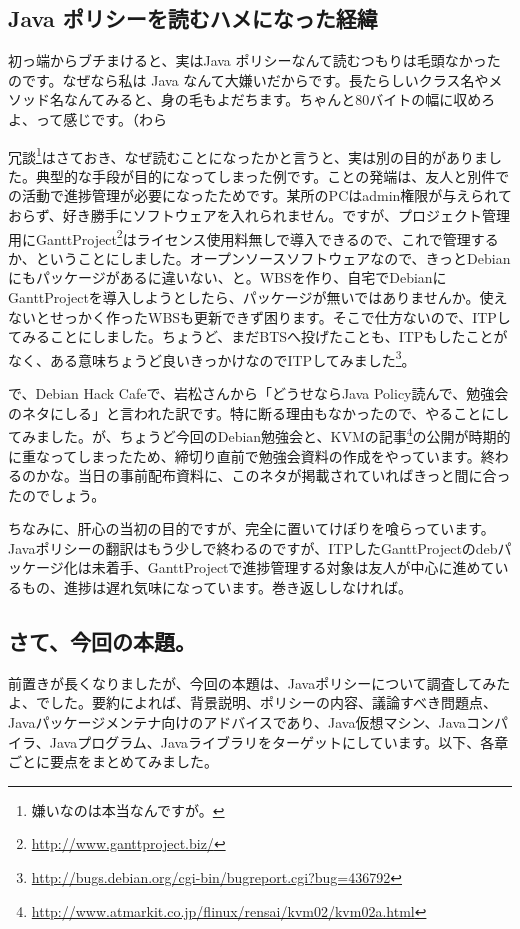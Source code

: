 \documentclass[mingoth,a4paper]{jsarticle}
\begin{document}
\subsection{Java ポリシーを読むハメになった経緯}

初っ端からブチまけると、実はJava ポリシーなんて読むつもりは毛頭なかったのです。なぜなら私は Java なんて大嫌いだからです。長たらしいクラス名やメソッド名なんてみると、身の毛もよだちます。ちゃんと80バイトの幅に収めろよ、って感じです。（わら

冗談\footnote{嫌いなのは本当なんですが。}はさておき、なぜ読むことになったかと言うと、実は別の目的がありました。典型的な手段が目的になってしまった例です。ことの発端は、友人と別件での活動で進捗管理が必要になったためです。某所のPCはadmin権限が与えられておらず、好き勝手にソフトウェアを入れられません。ですが、プロジェクト管理用にGanttProject\footnote{\url{http://www.ganttproject.biz/}}はライセンス使用料無しで導入できるので、これで管理するか、ということにしました。オープンソースソフトウェアなので、きっとDebianにもパッケージがあるに違いない、と。WBSを作り、自宅でDebianにGanttProjectを導入しようとしたら、パッケージが無いではありませんか。使えないとせっかく作ったWBSも更新できず困ります。そこで仕方ないので、ITPしてみることにしました。ちょうど、まだBTSへ投げたことも、ITPもしたことがなく、ある意味ちょうど良いきっかけなのでITPしてみました\footnote{\url{http://bugs.debian.org/cgi-bin/bugreport.cgi?bug=436792}}。

で、Debian Hack Cafeで、岩松さんから「どうせならJava Policy読んで、勉強会のネタにしる」と言われた訳です。特に断る理由もなかったので、やることにしてみました。が、ちょうど今回のDebian勉強会と、KVMの記事\footnote{\url{http://www.atmarkit.co.jp/flinux/rensai/kvm02/kvm02a.html}}の公開が時期的に重なってしまったため、締切り直前で勉強会資料の作成をやっています。終わるのかな。当日の事前配布資料に、このネタが掲載されていればきっと間に合ったのでしょう。

ちなみに、肝心の当初の目的ですが、完全に置いてけぼりを喰らっています。Javaポリシーの翻訳はもう少しで終わるのですが、ITPしたGanttProjectのdebパッケージ化は未着手、GanttProjectで進捗管理する対象は友人が中心に進めているもの、進捗は遅れ気味になっています。巻き返ししなければ。


\subsection{さて、今回の本題。}
前置きが長くなりましたが、今回の本題は、Javaポリシーについて調査してみたよ、でした。要約によれば、背景説明、ポリシーの内容、議論すべき問題点、Javaパッケージメンテナ向けのアドバイスであり、Java仮想マシン、Javaコンパイラ、Javaプログラム、Javaライブラリをターゲットにしています。以下、各章ごとに要点をまとめてみました。
\end{document}

